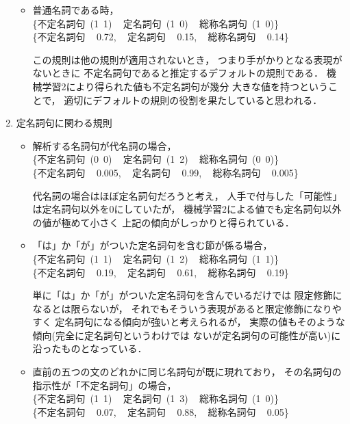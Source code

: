 \begin{enumerate}
\begin{itemize}
 \item 
   普通名詞である時，\\
   \mbox{\{\mbox{不定名詞句} (1 1) \,
     \mbox{定名詞句}   (1 0) \,
     \mbox{総称名詞句} (1 0)\}}\\
   \mbox{\{\mbox{不定名詞句} \, 0.72, \,
     \mbox{定名詞句}   \, 0.15, \,
     \mbox{総称名詞句} \, 0.14\}}
   
   この規則は他の規則が適用されないとき，
   つまり手がかりとなる表現がないときに
   不定名詞句であると推定するデフォルトの規則である．
   機械学習2により得られた値も不定名詞句が幾分
   大きな値を持つということで，
   適切にデフォルトの規則の役割を果たしていると思われる．

  \end{itemize}

\item 
  定名詞句に関わる規則
  \begin{itemize}
  \item 
    解析する名詞句が代名詞の場合，\\
    \mbox{\{\mbox{不定名詞句} (0 0) \,
      \mbox{定名詞句}   (1 2) \,
      \mbox{総称名詞句} (0 0)\}}\\
    \mbox{\{\mbox{不定名詞句} \, 0.005, \,
      \mbox{定名詞句}   \, 0.99, \,
      \mbox{総称名詞句} \, 0.005\}}

    代名詞の場合はほぼ定名詞句だろうと考え，
    人手で付与した「可能性」は定名詞句以外を0にしていたが，
    機械学習2による値でも定名詞句以外の値が極めて小さく
    上記の傾向がしっかりと得られている．

  \item 「は」か「が」がついた定名詞句を含む節が係る場合，\\
    \mbox{\{\mbox{不定名詞句} (1 1) \,
      \mbox{定名詞句}   (1 2) \,
      \mbox{総称名詞句} (1 1)\}}\\
    \mbox{\{\mbox{不定名詞句}  \, 0.19, \,
      \mbox{定名詞句}    \, 0.61, \,
      \mbox{総称名詞句}  \, 0.19\}}

    単に「は」か「が」がついた定名詞句を含んでいるだけでは
    限定修飾になるとは限らないが，
    それでもそういう表現があると限定修飾になりやすく
    定名詞句になる傾向が強いと考えられるが，
    実際の値もそのような傾向(完全に定名詞句というわけでは
    ないが定名詞句の可能性が高い)に沿ったものとなっている．

  \item
    直前の五つの文のどれかに同じ名詞句が既に現れており，
    その名詞句の指示性が「不定名詞句」の場合，\\
    \mbox{\{\mbox{不定名詞句} (1 1) \,
      \mbox{定名詞句}   (1 3) \,
      \mbox{総称名詞句} (1 0)\}}\\
    \mbox{\{\mbox{不定名詞句}  \, 0.07, \,
      \mbox{定名詞句}    \, 0.88, \,
      \mbox{総称名詞句}  \, 0.05\}}


\end{itemize}
\end{enumerate}
